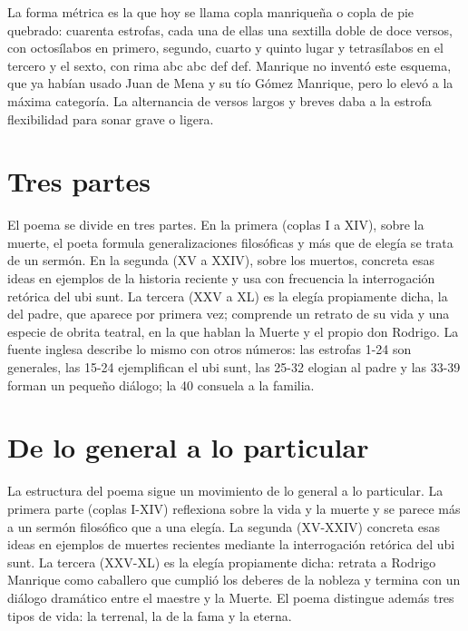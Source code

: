 \documentclass{book}
\begin{document}
La forma métrica es la que hoy se llama copla manriqueña o copla de pie quebrado: cuarenta estrofas, cada una de ellas una sextilla doble de doce versos, con octosílabos en primero, segundo, cuarto y quinto lugar y tetrasílabos en el tercero y el sexto, con rima abc abc def def. Manrique no inventó este esquema, que ya habían usado Juan de Mena y su tío Gómez Manrique, pero lo elevó a la máxima categoría. La alternancia de versos largos y breves daba a la estrofa flexibilidad para sonar grave o ligera.


\section{Tres partes}

El poema se divide en tres partes. En la primera (coplas I a XIV), sobre la muerte, el poeta formula generalizaciones filosóficas y más que de elegía se trata de un sermón. En la segunda (XV a XXIV), sobre los muertos, concreta esas ideas en ejemplos de la historia reciente y usa con frecuencia la interrogación retórica del ubi sunt. La tercera (XXV a XL) es la elegía propiamente dicha, la del padre, que aparece por primera vez; comprende un retrato de su vida y una especie de obrita teatral, en la que hablan la Muerte y el propio don Rodrigo. La fuente inglesa describe lo mismo con otros números: las estrofas 1-24 son generales, las 15-24 ejemplifican el ubi sunt, las 25-32 elogian al padre y las 33-39 forman un pequeño diálogo; la 40 consuela a la familia.


\section{De lo general a lo particular}

La estructura del poema sigue un movimiento de lo general a lo particular. La primera parte (coplas I-XIV) reflexiona sobre la vida y la muerte y se parece más a un sermón filosófico que a una elegía. La segunda (XV-XXIV) concreta esas ideas en ejemplos de muertes recientes mediante la interrogación retórica del ubi sunt. La tercera (XXV-XL) es la elegía propiamente dicha: retrata a Rodrigo Manrique como caballero que cumplió los deberes de la nobleza y termina con un diálogo dramático entre el maestre y la Muerte. El poema distingue además tres tipos de vida: la terrenal, la de la fama y la eterna.
\end{document}
